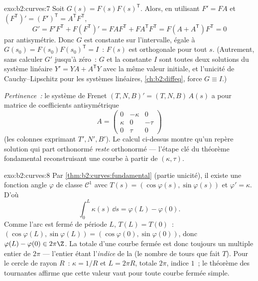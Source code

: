 \begin{solution}{exo:b2:curves:7}
Soit $G(s) = F(s)F(s)^{\mathsf T}$. Alors, en utilisant $F' = FA$ et
$(F^{\mathsf T})' = (F')^{\mathsf T} = A^{\mathsf T}F^{\mathsf T}$,
\[
G' = F'F^{\mathsf T} + F(F^{\mathsf T})'
= FAF^{\mathsf T} + FA^{\mathsf T}F^{\mathsf T}
= F(A + A^{\mathsf T})F^{\mathsf T} = 0
\]
par antisymétrie. Donc $G$ est constante sur l'intervalle, égale à
$G(s_0) = F(s_0)F(s_0)^{\mathsf T} = I$~: $F(s)$ est orthogonale pour
tout $s$. (Autrement, sans calculer $G'$ jusqu'à zéro~: $G$ et la
constante $I$ sont toutes deux solutions du système linéaire $Y' = YA +
A^{\mathsf T}Y$ avec la même valeur initiale, et l'unicité de
Cauchy--Lipschitz pour les systèmes linéaires,
\cref{ch:b2:diffeq}, force $G
\equiv I$.)

\emph{Pertinence~:} le système de Frenet $(T, N, B)' = (T, N,
B)\,A(s)$ a pour matrice de coefficients antisymétrique
\[
A = \begin{pmatrix} 0 & -\kappa & 0\\ \kappa & 0 & -\tau\\
0 & \tau & 0\end{pmatrix}
\]
(les colonnes exprimant $T', N', B'$). Le calcul ci-dessus montre
qu'un repère solution qui part orthonormé \emph{reste}
orthonormé --- l'étape clé du théorème fondamental
reconstruisant une courbe à partir de $(\kappa, \tau)$.
\end{solution}

\begin{solution}{exo:b2:curves:8}
Par \cref{thm:b2:curves:fundamental} (partie unicité), il existe
une fonction angle $\varphi$ de classe $\mathcal{C}^1$ avec $T(s) =
(\cos\varphi(s), \sin\varphi(s))$ et $\varphi' = \kappa$. D'où
\[
\int_0^L \kappa(s)\,\dd s = \varphi(L) - \varphi(0) .
\]
Comme l'arc est fermé de période $L$, $T(L) = T(0)$~:
$(\cos\varphi(L), \sin\varphi(L)) = (\cos\varphi(0),
\sin\varphi(0))$, donc $\varphi(L) - \varphi(0) \in 2\pi\Z$. La
 totale d'une courbe fermée est donc toujours un multiple
entier de $2\pi$ --- l'entier étant l'\emph{indice}
de la  (le nombre de tours  que fait $T$). Pour le
cercle de rayon $R$~: $\kappa = 1/R$ et $L = 2\pi R$, 
totale $2\pi$, indice $1$~; le théorème des 
tournantes affirme que cette valeur vaut pour toute courbe fermée
simple.
\end{solution}

